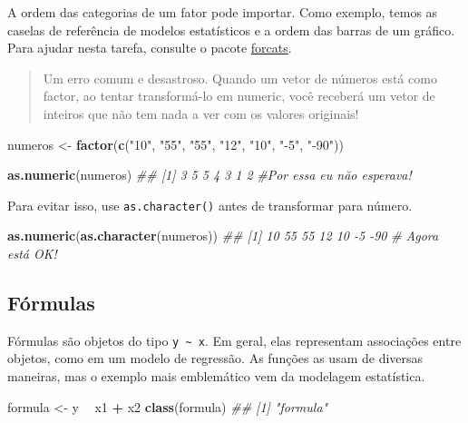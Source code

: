 \documentclass[]{book}
\newenvironment{Shaded}{\begin{snugshade}}{\end{snugshade}}
\newcommand{\CommentTok}[1]{\textcolor[rgb]{0.56,0.35,0.01}{\textit{#1}}}
\newcommand{\KeywordTok}[1]{\textcolor[rgb]{0.13,0.29,0.53}{\textbf{#1}}}
\newcommand{\NormalTok}[1]{#1}
\newcommand{\OperatorTok}[1]{\textcolor[rgb]{0.81,0.36,0.00}{\textbf{#1}}}
\newcommand{\StringTok}[1]{\textcolor[rgb]{0.31,0.60,0.02}{#1}}
\begin{document}
A ordem das categorias de um fator pode importar. Como exemplo, temos as caselas de referência de modelos estatísticos e a ordem das barras de um gráfico. Para ajudar nesta tarefa, consulte o pacote \href{https://github.com/tidyverse/forcats}{forcats}.

\begin{quote}
Um erro comum e desastroso. Quando um vetor de números está como factor, ao tentar transformá-lo em numeric, você receberá um vetor de inteiros que não tem nada a ver com os valores originais!
\end{quote}

\begin{Shaded}
\begin{Highlighting}[]
\NormalTok{numeros <-}\StringTok{ }\KeywordTok{factor}\NormalTok{(}\KeywordTok{c}\NormalTok{(}\StringTok{"10"}\NormalTok{, }\StringTok{"55"}\NormalTok{, }\StringTok{"55"}\NormalTok{, }\StringTok{"12"}\NormalTok{, }\StringTok{"10"}\NormalTok{, }\StringTok{"-5"}\NormalTok{, }\StringTok{"-90"}\NormalTok{))}

\KeywordTok{as.numeric}\NormalTok{(numeros)}
\CommentTok{## [1] 3 5 5 4 3 1 2}
\CommentTok{#Por essa eu năo esperava!}
\end{Highlighting}
\end{Shaded}

Para evitar isso, use \texttt{as.character()} antes de transformar para número.

\begin{Shaded}
\begin{Highlighting}[]
\KeywordTok{as.numeric}\NormalTok{(}\KeywordTok{as.character}\NormalTok{(numeros))}
\CommentTok{## [1]  10  55  55  12  10  -5 -90}
\CommentTok{# Agora está OK!}
\end{Highlighting}
\end{Shaded}

\hypertarget{fuxf3rmulas}{%
\subsection{Fórmulas}\label{fuxf3rmulas}}

Fórmulas são objetos do tipo \texttt{y\ \textasciitilde{}\ x}. Em geral, elas representam associações entre objetos, como em um modelo de regressão. As funções as usam de diversas maneiras, mas o exemplo mais emblemático vem da modelagem estatística.

\begin{Shaded}
\begin{Highlighting}[]
\NormalTok{formula <-}\StringTok{ }\NormalTok{y }\OperatorTok{~}\StringTok{ }\NormalTok{x1 }\OperatorTok{+}\StringTok{ }\NormalTok{x2}
\KeywordTok{class}\NormalTok{(formula)}
\CommentTok{## [1] "formula"}
\end{Highlighting}
\end{Shaded}
\end{document}
